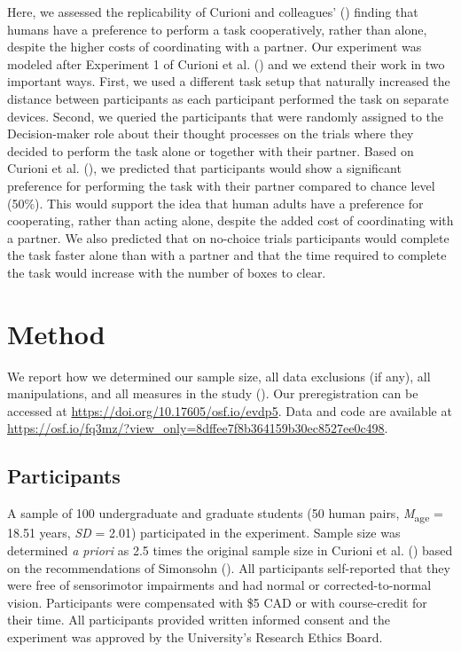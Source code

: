 \documentclass[
  man,
  floatsintext,
  longtable,
  nolmodern,
  notxfonts,
  notimes,
  mask,
  colorlinks=true,linkcolor=blue,citecolor=blue,urlcolor=blue]{apa7}
\begin{document}
Here, we assessed the replicability of Curioni and colleagues'
() finding that humans have a preference
to perform a task cooperatively, rather than alone, despite the higher
costs of coordinating with a partner. Our experiment was modeled after
Experiment 1 of Curioni et al. () and we
extend their work in two important ways. First, we used a different task
setup that naturally increased the distance between participants as each
participant performed the task on separate devices. Second, we queried
the participants that were randomly assigned to the Decision-maker role
about their thought processes on the trials where they decided to
perform the task alone or together with their partner. Based on Curioni
et al. (), we predicted that
participants would show a significant preference for performing the task
with their partner compared to chance level (50\%). This would support
the idea that human adults have a preference for cooperating, rather
than acting alone, despite the added cost of coordinating with a
partner. We also predicted that on no-choice trials participants would
complete the task faster alone than with a partner and that the time
required to complete the task would increase with the number of boxes to
clear.

\section{Method}\label{method}

We report how we determined our sample size, all data exclusions (if
any), all manipulations, and all measures in the study
(). Our preregistration
can be accessed at \url{https://doi.org/10.17605/osf.io/evdp5}. Data and
code are available at
\url{https://osf.io/fq3mz/?view_only=8dffee7f8b364159b30ec8527ee0c498}.

\subsection{Participants}\label{participants}

A sample of 100 undergraduate and graduate students (50 human pairs,
\emph{M}\textsubscript{age} = 18.51 years, \emph{SD} = 2.01)
participated in the experiment. Sample size was determined \emph{a
priori} as 2.5 times the original sample size in Curioni et al.
() based on the recommendations of
Simonsohn (). All participants
self-reported that they were free of sensorimotor impairments and had
normal or corrected-to-normal vision. Participants were compensated with
\$5 CAD or with course-credit for their time. All participants provided
written informed consent and the experiment was approved by the
University's Research Ethics Board.
\end{document}
